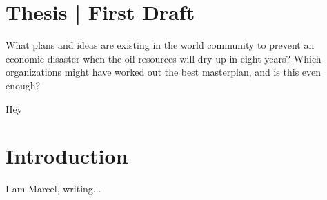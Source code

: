\section{Thesis | First Draft}

What plans and ideas are existing in the world community to prevent an economic 
disaster when the oil resources will dry up in eight years? Which organizations 
might have worked out the best masterplan, and is this even enough?

Hey

\section{Introduction}
\label{sec:introduction}
I am Marcel, writing...